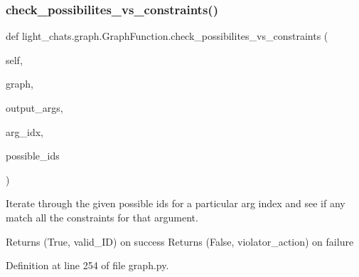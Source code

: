 \subsubsection{\texorpdfstring{check\+\_\+possibilites\+\_\+vs\+\_\+constraints()}{check\_possibilites\_vs\_constraints()}}
{\footnotesize\ttfamily def light\+\_\+chats.\+graph.\+Graph\+Function.\+check\+\_\+possibilites\+\_\+vs\+\_\+constraints (\begin{DoxyParamCaption}\item[{}]{self,  }\item[{}]{graph,  }\item[{}]{output\+\_\+args,  }\item[{}]{arg\+\_\+idx,  }\item[{}]{possible\+\_\+ids }\end{DoxyParamCaption})}

\begin{DoxyVerb}Iterate through the given possible ids for a particular arg index and see if any
match all the constraints for that argument.

Returns (True, valid_ID) on success Returns (False, violator_action) on failure
\end{DoxyVerb}
 

Definition at line 254 of file graph.\+py.


